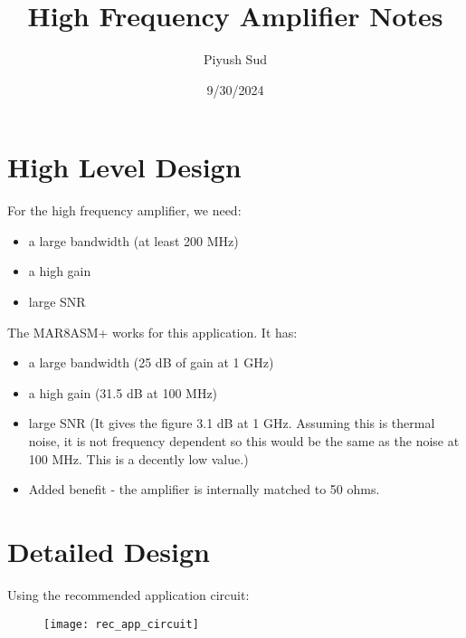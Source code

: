 \documentclass[12pt, letterpaper]{article}
\title{High Frequency Amplifier Notes}
\author{Piyush Sud}
\date{9/30/2024}
\begin{document}
\maketitle

\pagebreak

\section{High Level Design}

For the high frequency amplifier, we need:

\begin{itemize}
    \item a large bandwidth (at least 200 MHz)
    \item a high gain
    \item large SNR
\end{itemize}

\noindent The MAR8ASM+ works for this application. It has:

\begin{itemize}
    \item a large bandwidth (25 dB of gain at 1 GHz)
    \item a high gain (31.5 dB at 100 MHz)
    \item large SNR (It gives the figure 3.1 dB at 1 GHz. Assuming this is thermal noise, it is not frequency dependent so this would be the same as the noise at 100 MHz. This is a decently low value.)
    \item Added benefit - the amplifier is internally matched to 50 ohms.
\end{itemize}

\section{Detailed Design}

Using the recommended application circuit:
\begin{figure} [h]
    \texttt{[image: rec\_app\_circuit]}
\end{figure}
\end{document}
